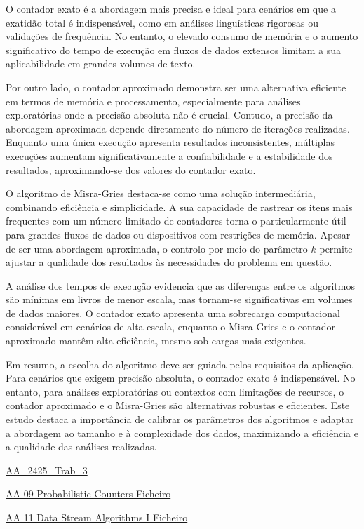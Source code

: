 \documentclass[shortpaper, portugues, times, mirror]{revdetua}
\begin{document}
O contador exato é a abordagem mais precisa e ideal para cenários em que a exatidão total é indispensável, como em análises linguísticas rigorosas ou validações de frequência. No entanto, o elevado consumo de memória e o aumento significativo do tempo de execução em fluxos de dados extensos limitam a sua aplicabilidade em grandes volumes de texto.

Por outro lado, o contador aproximado demonstra ser uma alternativa eficiente em termos de memória e processamento, especialmente para análises exploratórias onde a precisão absoluta não é crucial. Contudo, a precisão da abordagem aproximada depende diretamente do número de iterações realizadas. Enquanto uma única execução apresenta resultados inconsistentes, múltiplas execuções aumentam significativamente a confiabilidade e a estabilidade dos resultados, aproximando-se dos valores do contador exato.

O algoritmo de Misra-Gries destaca-se como uma solução intermediária, combinando eficiência e simplicidade. A sua capacidade de rastrear os itens mais frequentes com um número limitado de contadores torna-o particularmente útil para grandes fluxos de dados ou dispositivos com restrições de memória. Apesar de ser uma abordagem aproximada, o controlo por meio do parâmetro \(k\) permite ajustar a qualidade dos resultados às necessidades do problema em questão.

A análise dos tempos de execução evidencia que as diferenças entre os algoritmos são mínimas em livros de menor escala, mas tornam-se significativas em volumes de dados maiores. O contador exato apresenta uma sobrecarga computacional considerável em cenários de alta escala, enquanto o Misra-Gries e o contador aproximado mantêm alta eficiência, mesmo sob cargas mais exigentes.

Em resumo, a escolha do algoritmo deve ser guiada pelos requisitos da aplicação. Para cenários que exigem precisão absoluta, o contador exato é indispensável. No entanto, para análises exploratórias ou contextos com limitações de recursos, o contador aproximado e o Misra-Gries são alternativas robustas e eficientes. Este estudo destaca a importância de calibrar os parâmetros dos algoritmos e adaptar a abordagem ao tamanho e à complexidade dos dados, maximizando a eficiência e a qualidade das análises realizadas.

\begin{thebibliography}{2}

\bibitem{}
\url{AA_2425_Trab_3}

\bibitem{}
\url{AA 09 Probabilistic Counters Ficheiro}

\bibitem{}
\url{AA 11 Data Stream Algorithms I Ficheiro}
\end{thebibliography}
\end{document}
